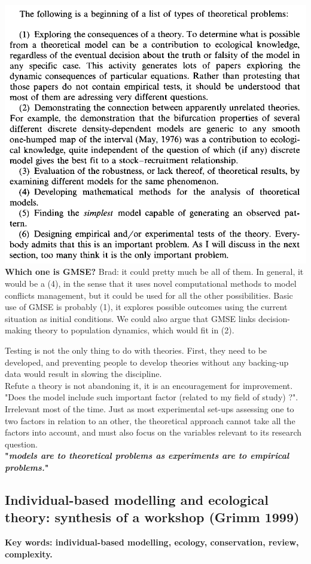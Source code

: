 \documentclass[12pt]{article}
\begin{document}
\includegraphics[scale=0.5]{theoreticalProblems1988.png}\\
\textbf{Which one is GMSE?} Brad: it could pretty much be all of them. In general, it would be a (4), in the sense that it uses novel computational methods to model conflicts management, but it could be used for all the other possibilities. Basic use of GMSE is probably (1), it explores possible outcomes using the current situation as initial conditions. We could also argue that GMSE links decision-making theory to population dynamics, which would fit in (2).

Testing is not the only thing to do with theories. First, they need to be developed, and preventing people to develop theories without any backing-up data would result in slowing the discipline.\\
Refute a theory is not abandoning it, it is an encouragement for improvement.\\
"Does the model include such important factor (related to my field of study) ?". Irrelevant most of the time. Just as most experimental set-ups assessing one to two factors in relation to an other, the theoretical approach cannot take all the factors into account, and must also focus on the variables relevant to its research question.\\
\textbf{"\textit{models are to theoretical problems as experiments are to empirical problems.}"}

\subsection{Individual-based  modelling  and  ecological  theory: synthesis  of  a  workshop (Grimm 1999)}
\textbf{Key words: individual-based modelling, ecology, conservation, review, complexity.}
\end{document}
